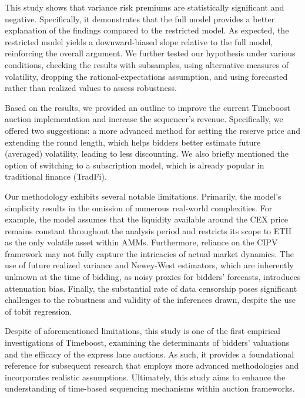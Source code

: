 \documentclass[runningheads]{llncs}
\begin{document}
This study shows that variance risk premiums are statistically significant and negative. Specifically, it demonstrates that the full model provides a better explanation of the findings compared to the restricted model. As expected, the restricted model yields a downward-biased slope relative to the full model, reinforcing the overall argument. We further tested our hypothesis under various conditions, checking the results with subsamples, using alternative measures of volatility, dropping the rational-expectations assumption, and using forecasted rather than realized values to assess robustness.

Based on the results, we provided an outline to improve the current Timeboost auction implementation and increase the sequencer's revenue. Specifically, we offered two suggestions: a more advanced method for setting the reserve price and extending the round length, which helps bidders better estimate future (averaged) volatility, leading to less discounting. We also briefly mentioned the option of switching to a subscription model, which is already popular in traditional finance (TradFi).

Our methodology exhibits several notable limitations. Primarily, the model's simplicity results in the omission of numerous real-world complexities. For example, the model assumes that the liquidity available around the CEX price remains constant throughout the analysis period and restricts its scope to ETH as the only volatile asset within AMMs. Furthermore, reliance on the CIPV framework may not fully capture the intricacies of actual market dynamics. The use of future realized variance and Newey-West estimators, which are inherently unknown at the time of bidding, as noisy proxies for bidders’ forecasts, introduces attenuation bias. Finally, the substantial rate of data censorship poses significant challenges to the robustness and validity of the inferences drawn, despite the use of tobit regression.

Despite of aforementioned limitations, this study is one of the first empirical investigations of Timeboost, examining the determinants of bidders' valuations and the efficacy of the express lane auctions. As such, it provides a foundational reference for subsequent research that employs more advanced methodologies and incorporates realistic assumptions. Ultimately, this study aims to enhance the understanding of time-based sequencing mechanisms within auction frameworks.
\end{document}
